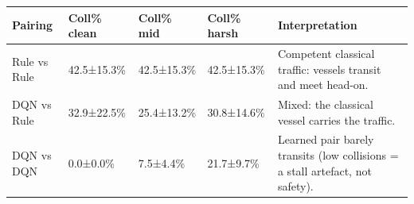 \begin{tabular}{lllll}
\toprule
Pairing & Coll\% clean & Coll\% mid & Coll\% harsh & Interpretation \\
\midrule
Rule vs Rule & 42.5±15.3\% & 42.5±15.3\% & 42.5±15.3\% & Competent classical traffic: vessels transit and meet head-on. \\
DQN vs Rule & 32.9±22.5\% & 25.4±13.2\% & 30.8±14.6\% & Mixed: the classical vessel carries the traffic. \\
DQN vs DQN & 0.0±0.0\% & 7.5±4.4\% & 21.7±9.7\% & Learned pair barely transits (low collisions = a stall artefact, not safety). \\
\bottomrule
\end{tabular}
